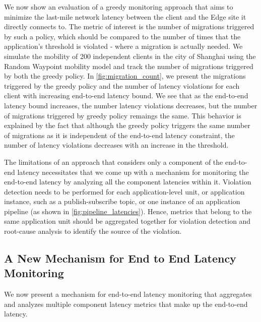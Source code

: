 \par We now show an evaluation of a greedy monitoring approach that aims to minimize the last-mile network latency between the client and the Edge site it directly connects to. The metric of interest is the number of migrations triggered by such a policy, which should be compared to the number of times that the application's threshold is  violated - where a migration is actually needed. We simulate the mobility of 200 independent clients in the city of Shanghai using the Random Waypoint mobility model and track the number of migrations triggered by both the greedy policy. In \cref{fig:migration_count}, we present the migrations triggered by the greedy policy and the number of latency violations for each client with increasing end-to-end latency bound. We see that as the end-to-end latency bound increases, the number latency violations decreases, but the number of migrations triggered by greedy policy remaings the same. This behavior is explained by the fact that although the greedy policy triggers the same number of migrations as it is independent of the end-to-end latency constraint, the number of latency violations decreases with an increase in the threshold. 
\par The limitations of an approach that considers only a component of the end-to-end latency necessitates that we come up with a mechanism for monitoring the end-to-end latency by analyzing all the component latencies within it. Violation detection needs to be performed for each application-level unit, or application instance, such as a publish-subscribe topic, or one instance of an application pipeline (as shown in \cref{fig:pipeline_latencies}). Hence, metrics that belong to the same application unit should be aggregated together for violation detection and root-cause analysis to identify the source of the violation.

\subsection{A New Mechanism for End to End Latency Monitoring}
We now present a mechanism for end-to-end latency monitoring that aggregates and analyzes multiple component latency metrics that make up the end-to-end latency.
